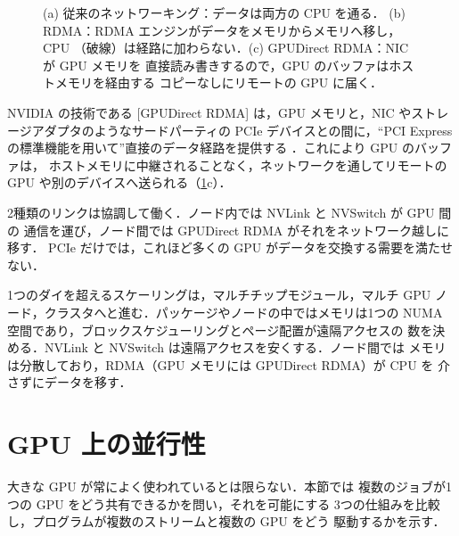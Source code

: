 \documentclass[../main.tex]{subfiles}
\begin{document}
\begin{figure}[tb]
  \centering
  
  \caption{(a) 従来のネットワーキング：データは両方の CPU を通る．
    (b) RDMA：RDMA エンジンがデータをメモリからメモリへ移し，CPU
    （破線）は経路に加わらない．(c) GPUDirect RDMA：NIC が GPU メモリを
    直接読み書きするので，GPU のバッファはホストメモリを経由する
    コピーなしにリモートの GPU に届く．}
  \label{fig:l09-rdma}
\end{figure}

\begin{definition}
  NVIDIA の技術である
  [GPUDirect RDMA]
  は，GPU メモリと，NIC やストレージアダプタのようなサードパーティの
  PCIe デバイスとの間に，\enquote{PCI Express の標準機能を用いて}直接のデータ経路を提供する
  \cite{nvidia2026gpudirectrdma}．これにより GPU のバッファは，
  ホストメモリに中継されることなく，ネットワークを通してリモートの GPU
  や別のデバイスへ送られる（\cref{fig:l09-rdma}c）．
\end{definition}

%
2種類のリンクは協調して働く．ノード内では NVLink と NVSwitch が GPU 間の
通信を運び，ノード間では GPUDirect RDMA がそれをネットワーク越しに移す．
PCIe だけでは，これほど多くの GPU がデータを交換する需要を満たせない．

\begin{keypoint}
  1つのダイを超えるスケーリングは，マルチチップモジュール，マルチ GPU
  ノード，クラスタへと進む．パッケージやノードの中ではメモリは1つの
  NUMA 空間であり，ブロックスケジューリングとページ配置が遠隔アクセスの
  数を決める．NVLink と NVSwitch は遠隔アクセスを安くする．ノード間では
  メモリは分散しており，RDMA（GPU メモリには GPUDirect RDMA）が CPU を
  介さずにデータを移す．
\end{keypoint}

\section{GPU 上の並行性}
\label{sec:l09-concurrency}

大きな GPU が常によく使われているとは限らない．本節では
複数のジョブが1つの GPU をどう共有できるかを問い，それを可能にする
3つの仕組みを比較し，プログラムが複数のストリームと複数の GPU をどう
駆動するかを示す．
\end{document}
